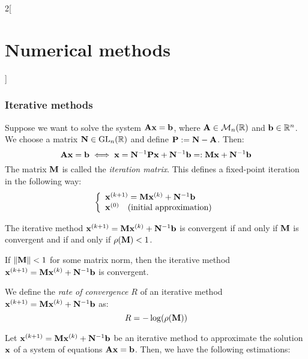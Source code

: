 \documentclass[../../../main.tex]{subfiles}
\begin{document}
\begin{multicols}{2}[\section{Numerical methods}]
    \subsubsection*{Iterative methods}
    \begin{definition}
        Suppose we want to solve the system $\vb{A}\vb{x}=\vb{b}$, where $\vb{A}\in\mathcal{M}_n(\mathbb{R})$ and $\vb{b}\in\mathbb{R}^n$. We choose a matrix $\vb{N}\in\mathrm{GL}_n(\mathbb{R})$ and define $\vb{P}:=\vb{N}-\vb{A}$. Then: $$\vb{A}\vb{x}=\vb{b}\iff \vb{x}=\vb{N}^{-1}\vb{P}\vb{x}+\vb{N}^{-1}\vb{b}=:\vb{M}\vb{x}+\vb{N}^{-1}\vb{b}$$ The matrix $\vb{M}$ is called the \textit{iteration matrix}. This defines a fixed-point iteration in the following way:
        \begin{equation*}
            \left\{
            \begin{array}{l}
                \vb{x}^{(k+1)}=\vb{M}\vb{x}^{(k)}+\vb{N}^{-1}\vb{b} \\
                \vb{x}^{(0)}\quad\text{(initial approximation)}
            \end{array}\right.
        \end{equation*}
    \end{definition}
    \begin{theorem}
        The iterative method $\vb{x}^{(k+1)}=\vb{M}\vb{x}^{(k)}+\vb{N}^{-1}\vb{b}$ is convergent if and only if $\vb{M}$ is convergent and if and only if $\rho(\vb{M})<1$.
    \end{theorem}
    \begin{corollary}
        If $\|\vb{M}\|<1$ for some matrix norm, then the iterative method $\vb{x}^{(k+1)}=\vb{M}\vb{x}^{(k)}+\vb{N}^{-1}\vb{b}$ is convergent.
    \end{corollary}
    \begin{definition}
        We define the \textit{rate of convergence $R$} of an iterative method $\vb{x}^{(k+1)}=\vb{M}\vb{x}^{(k)}+\vb{N}^{-1}\vb{b}$ as: $$R=-\log(\rho(\vb{M}))$$
    \end{definition}
    \begin{prop}
        Let $\vb{x}^{(k+1)}=\vb{M}\vb{x}^{(k)}+\vb{N}^{-1}\vb{b}$ be an iterative method to approximate the solution $\vb{x}$ of a system of equations $\vb{A}\vb{x}=\vb{b}$. Then, we have the following estimations:

\end{prop}
\end{multicols}
\end{document}

